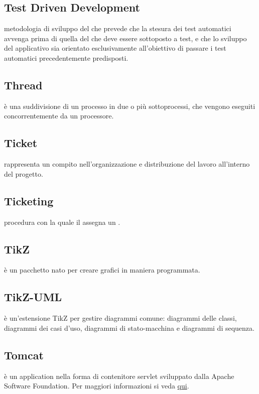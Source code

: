 \documentclass[12pt,a4paper]{article}
\begin{document}
\subsection{Test Driven Development} 
 metodologia di sviluppo del  che prevede che la stesura dei test automatici avvenga prima di quella del  che deve essere sottoposto a  test, e che lo sviluppo del  applicativo sia orientato esclusivamente all'obiettivo di passare i test automatici precedentemente predisposti.

\subsection{Thread} 
è una suddivisione di un processo in due o più sottoprocessi, che vengono eseguiti concorrentemente da un processore.

\subsection{Ticket} 
rappresenta un compito nell'organizzazione e distribuzione del lavoro all'interno del progetto.

\subsection{Ticketing} 
procedura con la quale il \RE assegna un .

\subsection{TikZ} 
è un pacchetto  nato per creare grafici in maniera programmata.

\subsection{TikZ-UML} 
è un'estensione TikZ per gestire diagrammi  comune: diagrammi delle classi, diagrammi dei casi d'uso, diagrammi di stato-macchina e diagrammi di sequenza.

\subsection{Tomcat} 
è un application  nella forma di contenitore servlet  sviluppato dalla Apache Software Foundation. Per maggiori informazioni si veda \href{https://it.wikipedia.org/wiki/Apache_Tomcat}{qui}.
\end{document}
